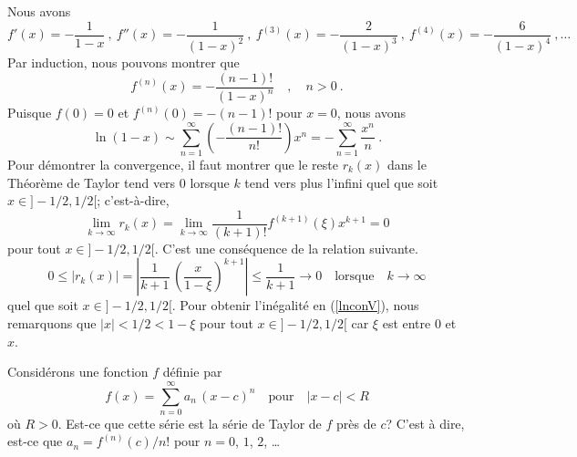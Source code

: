{\begin{egg}
Nous avons
\[
f'(x) = -\frac{1}{1-x} \ , \ f''(x) = -\frac{1}{(1-x)^2} \ , \ 
f^{(3)}(x) = -\frac{2}{(1-x)^3} \ , \  f^{(4)}(x) = -\frac{6}{(1-x)^4}
\ , \ldots
\]
Par induction, nous pouvons montrer que
\[
f^{(n)}(x) = -\frac{(n-1)!}{(1-x)^n} \quad , \quad n>0 \ .
\]
Puisque $f(0)=0$ et $f^{(n)}(0)= -(n-1)!$ pour $x=0$, nous avons
\[
\ln(1-x) \sim \sum_{n=1}^\infty \left(-\frac{(n-1)!}{n!}\right) x^n 
= - \sum_{n=1}^\infty \frac{x^n}{n} \ .
\]
Pour démontrer la convergence, il faut montrer que le reste $r_k(x)$ dans le
Théorème de Taylor tend vers $0$ lorsque $k$ tend vers plus l'infini
quel que soit $x \in ]-1/2,1/2[$; c'est-à-dire, 
\[
\lim_{k\rightarrow \infty} r_k(x) =
\lim_{k\rightarrow \infty} \frac{1}{(k+1)!} f^{(k+1)}(\xi) x^{k+1} = 0
\]
pour tout $x \in ]-1/2,1/2[$.  C'est une conséquence de la relation
suivante.
\begin{equation} \label{lnconV}
0 \leq \left| r_k(x) \right|
= \left|\frac{1}{k+1} \, \left(\frac{x}{1-\xi}\right)^{k+1} \right|
\leq \frac{1}{k+1} \rightarrow 0 \quad \text{lorsque} \quad
k \rightarrow \infty
\end{equation}
quel que soit $x \in ]-1/2,1/2[$.  Pour obtenir l'inégalité en
(\ref{lnconV}), nous remarquons que $|x| < 1/2 < 1-\xi$ pour tout
$x \in ]-1/2,1/2[$ car $\xi$ est entre $0$ et $x$.
\end{egg}

Considérons une fonction $f$ définie par
\[
f(x) = \sum_{n=0}^\infty a_n \, (x-c)^n \quad \text{pour} \quad |x-c|<R
\]
où $R>0$.  Est-ce que cette série est la série de Taylor de $f$ près de $c$?
C'est à dire, est-ce que $a_n = f^{(n)}(c) \big/n!$ pour $n=0$, $1$, $2$,
\ldots

}
